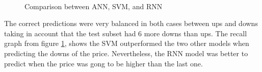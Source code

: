 \begin{figure}
\center
{} 
 \\
\caption{Comparison between ANN, SVM, and RNN}
\label{fig:comparison}
\end{figure}

The correct predictions were very balanced in both cases between ups and downs taking in account that the test subset had 6 more downs than ups. The recall graph from figure \ref{fig:comparison}, shows the SVM outperformed the two other models when predicting the downs of the price. Nevertheless, the RNN model was better to predict when the price was gong to be higher than the last one.

